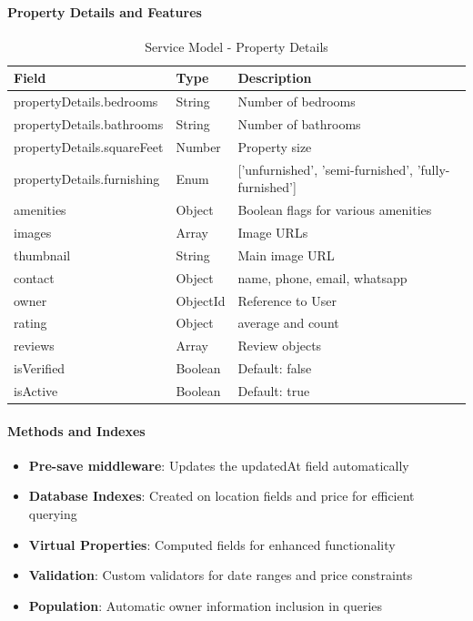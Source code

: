 \documentclass[12pt,a4paper]{article}
\begin{document}
\paragraph{Property Details and Features}
\begin{table}[H]
\centering
\small
\begin{tabular}{@{}lll@{}}
\toprule
\textbf{Field} & \textbf{Type} & \textbf{Description} \\
\midrule
propertyDetails.bedrooms & String & Number of bedrooms \\
propertyDetails.bathrooms & String & Number of bathrooms \\
propertyDetails.squareFeet & Number & Property size \\
propertyDetails.furnishing & Enum & ['unfurnished', 'semi-furnished', 'fully-furnished'] \\
amenities & Object & Boolean flags for various amenities \\
images & Array & Image URLs \\
thumbnail & String & Main image URL \\
contact & Object & name, phone, email, whatsapp \\
owner & ObjectId & Reference to User \\
rating & Object & average and count \\
reviews & Array & Review objects \\
isVerified & Boolean & Default: false \\
isActive & Boolean & Default: true \\
\bottomrule
\end{tabular}
\caption{Service Model - Property Details}
\label{tab:service-details-schema}
\end{table}

\paragraph{Methods and Indexes}
\begin{itemize}
\item \textbf{Pre-save middleware}: Updates the updatedAt field automatically
\item \textbf{Database Indexes}: Created on location fields and price for efficient querying
\item \textbf{Virtual Properties}: Computed fields for enhanced functionality
\item \textbf{Validation}: Custom validators for date ranges and price constraints
\item \textbf{Population}: Automatic owner information inclusion in queries
\end{itemize}
\end{document}
